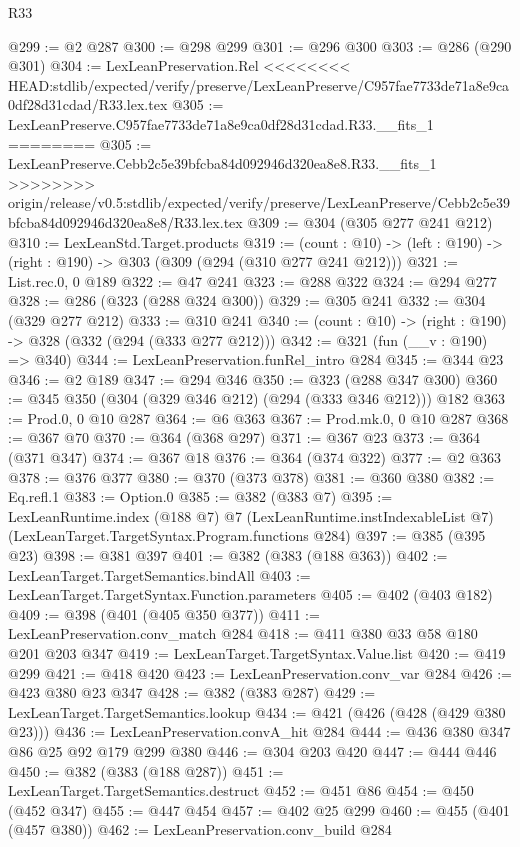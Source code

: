 \begin{lexlean}{R33}
\begin{coremodule}
{{{{{{{{@299 := @2 @287
@300 := @298 @299
@301 := @296 @300
@303 := @286 (@290 @301)
@304 := LexLeanPreservation.Rel
<<<<<<<< HEAD:stdlib/expected/verify/preserve/LexLeanPreserve/C957fae7733de71a8e9ca0df28d31cdad/R33.lex.tex
@305 := LexLeanPreserve.C957fae7733de71a8e9ca0df28d31cdad.R33.__fits_1
========
@305 := LexLeanPreserve.Cebb2c5e39bfcba84d092946d320ea8e8.R33.__fits_1
>>>>>>>> origin/release/v0.5:stdlib/expected/verify/preserve/LexLeanPreserve/Cebb2c5e39bfcba84d092946d320ea8e8/R33.lex.tex
@309 := @304 (@305 @277 @241 @212)
@310 := LexLeanStd.Target.products
@319 := (count : @10) -> (left : @190) -> (right : @190) -> @303 (@309 (@294 (@310 @277 @241 @212)))
@321 := List.rec.{0, 0} @189
@322 := @47 @241
@323 := @288 @322
@324 := @294 @277
@328 := @286 (@323 (@288 @324 @300))
@329 := @305 @241
@332 := @304 (@329 @277 @212)
@333 := @310 @241
@340 := (count : @10) -> (right : @190) -> @328 (@332 (@294 (@333 @277 @212)))
@342 := @321 (fun (__v : @190) => @340)
@344 := LexLeanPreservation.funRel_intro @284
@345 := @344 @23
@346 := @2 @189
@347 := @294 @346
@350 := @323 (@288 @347 @300)
@360 := @345 @350 (@304 (@329 @346 @212) (@294 (@333 @346 @212))) @182
@363 := Prod.{0, 0} @10 @287
@364 := @6 @363
@367 := Prod.mk.{0, 0} @10 @287
@368 := @367 @70
@370 := @364 (@368 @297)
@371 := @367 @23
@373 := @364 (@371 @347)
@374 := @367 @18
@376 := @364 (@374 @322)
@377 := @2 @363
@378 := @376 @377
@380 := @370 (@373 @378)
@381 := @360 @380
@382 := Eq.refl.{1}
@383 := Option.{0}
@385 := @382 (@383 @7)
@395 := LexLeanRuntime.index
    (@188 @7)
    @7
    (LexLeanRuntime.instIndexableList @7)
    (LexLeanTarget.TargetSyntax.Program.functions @284)
@397 := @385 (@395 @23)
@398 := @381 @397
@401 := @382 (@383 (@188 @363))
@402 := LexLeanTarget.TargetSemantics.bindAll
@403 := LexLeanTarget.TargetSyntax.Function.parameters
@405 := @402 (@403 @182)
@409 := @398 (@401 (@405 @350 @377))
@411 := LexLeanPreservation.conv_match @284
@418 := @411 @380 @33 @58 @180 @201 @203 @347
@419 := LexLeanTarget.TargetSyntax.Value.list
@420 := @419 @299
@421 := @418 @420
@423 := LexLeanPreservation.conv_var @284
@426 := @423 @380 @23 @347
@428 := @382 (@383 @287)
@429 := LexLeanTarget.TargetSemantics.lookup
@434 := @421 (@426 (@428 (@429 @380 @23)))
@436 := LexLeanPreservation.convA_hit @284
@444 := @436 @380 @347 @86 @25 @92 @179 @299 @380
@446 := @304 @203 @420
@447 := @444 @446
@450 := @382 (@383 (@188 @287))
@451 := LexLeanTarget.TargetSemantics.destruct
@452 := @451 @86
@454 := @450 (@452 @347)
@455 := @447 @454
@457 := @402 @25 @299
@460 := @455 (@401 (@457 @380))
@462 := LexLeanPreservation.conv_build @284
}}}}}}}}
\end{coremodule}
\end{lexlean}
